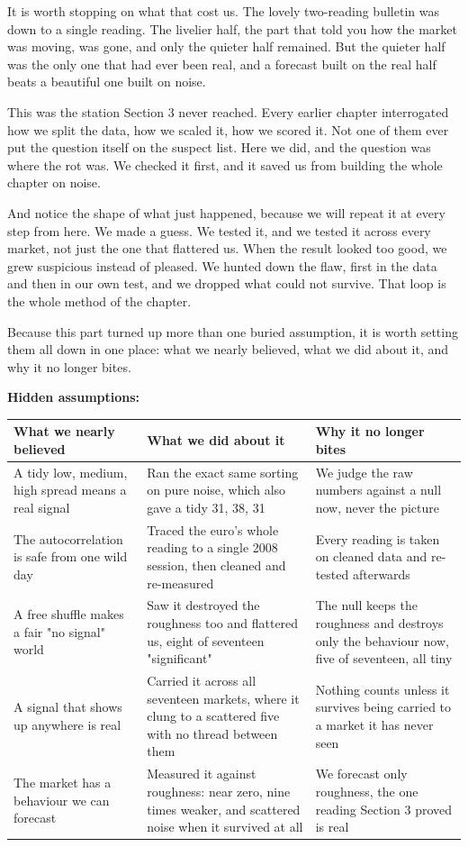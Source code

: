 \documentclass[11pt]{article} %
\begin{document}
It is worth stopping on what that cost us. The lovely two-reading bulletin was down to a single reading. The livelier half, the part that told you how the market was moving, was gone, and only the quieter half remained. But the quieter half was the only one that had ever been real, and a forecast built on the real half beats a beautiful one built on noise.

This was the station Section 3 never reached. Every earlier chapter interrogated how we split the data, how we scaled it, how we scored it. Not one of them ever put the question itself on the suspect list. Here we did, and the question was where the rot was. We checked it first, and it saved us from building the whole chapter on noise.

And notice the shape of what just happened, because we will repeat it at every step from here. We made a guess. We tested it, and we tested it across every market, not just the one that flattered us. When the result looked too good, we grew suspicious instead of pleased. We hunted down the flaw, first in the data and then in our own test, and we dropped what could not survive. That loop is the whole method of the chapter.

Because this part turned up more than one buried assumption, it is worth setting them all down in one place: what we nearly believed, what we did about it, and why it no longer bites.

\textbf{Hidden assumptions:}

\begin{center}
\begin{tabular}{lll}
\hline
What we nearly believed & What we did about it & Why it no longer bites \\
\hline
A tidy low, medium, high spread means a real signal & Ran the exact same sorting on pure noise, which also gave a tidy 31, 38, 31 & We judge the raw numbers against a null now, never the picture \\
The autocorrelation is safe from one wild day & Traced the euro's whole reading to a single 2008 session, then cleaned and re-measured & Every reading is taken on cleaned data and re-tested afterwards \\
A free shuffle makes a fair "no signal" world & Saw it destroyed the roughness too and flattered us, eight of seventeen "significant" & The null keeps the roughness and destroys only the behaviour now, five of seventeen, all tiny \\
A signal that shows up anywhere is real & Carried it across all seventeen markets, where it clung to a scattered five with no thread between them & Nothing counts unless it survives being carried to a market it has never seen \\
The market has a behaviour we can forecast & Measured it against roughness: near zero, nine times weaker, and scattered noise when it survived at all & We forecast only roughness, the one reading Section 3 proved is real \\
\hline
\end{tabular}
\end{center}
\end{document}
